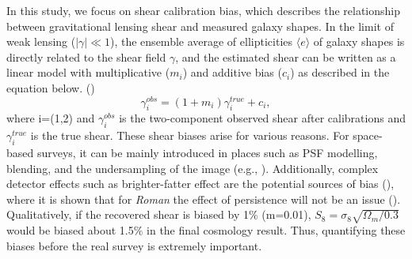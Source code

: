 \documentclass[fleqn,usenatbib]{mnras}
\begin{document}
In this study, we focus on shear calibration bias, which describes the relationship between gravitational lensing shear and measured galaxy shapes. In the limit of weak lensing ($\lvert\gamma\rvert\ll1$), the ensemble average of ellipticities $\langle e \rangle$ of galaxy shapes is directly related to the shear field $\gamma$, and the estimated shear can be written as a linear model with multiplicative ($m_{i}$) and additive bias ($c_{i}$) as described in the equation below. (\citealt{2006MNRAS.368.1323H, 2006MNRAS.366..101H, 2007MNRAS.376...13M}) 
\begin{equation}
    \gamma^{obs}_{i} = (1+m_{i})\gamma^{true}_{i} + c_{i}, 
    \label{eqn:linear}
\end{equation}
where i=(1,2) and $\gamma^{obs}_{i}$ is the two-component observed shear after calibrations and $\gamma^{true}_{i}$ is the true shear. These shear biases arise for various reasons. For space-based surveys, it can be mainly introduced in places such as PSF modelling, blending, and the undersampling of the image (e.g., \citealt{2018ARA&A..56..393M}). Additionally, complex detector effects such as brighter-fatter effect are the potential sources of bias (\citealt{2013MNRAS.429..661M}), where it is shown that for \emph{Roman} the effect of persistence will not be an issue (\citealt{2021arXiv210610273L}). Qualitatively, if the recovered shear is biased by 1$\%$ (m=0.01), $S_{8} = \sigma_{8} \sqrt{\Omega_{m}/0.3}$ would be biased about 1.5$\%$ in the final cosmology result. Thus, quantifying these biases before the real survey is extremely important. \par
\end{document}
